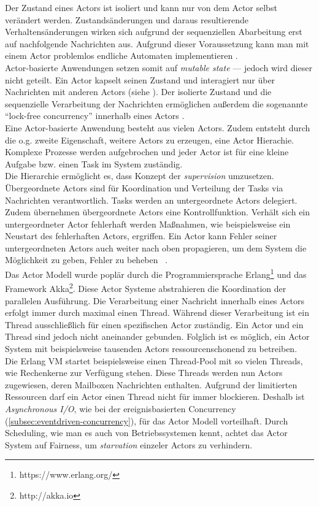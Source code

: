 Der Zustand eines Actors ist isoliert und kann nur von dem Actor selbst verändert werden. Zustandsänderungen und daraus resultierende Verhaltensänderungen wirken sich aufgrund der sequenziellen Abarbeitung erst auf nachfolgende Nachrichten aus. Aufgrund dieser Voraussetzung kann man mit einem Actor problemlos endliche Automaten implementieren \cite[S.~14]{vernon_reactive_2016} \cite[S.~84]{kuhn_reactive_2015}.\\
Actor-basierte Anwendungen setzen somit auf \textit{mutable state} --- jedoch wird dieser nicht geteilt. Ein Actor kapselt seinen Zustand und interagiert nur über Nachrichten mit anderen Actors (siehe ). Der isolierte Zustand und die sequenzielle Verarbeitung der Nachrichten ermöglichen außerdem die sogenannte \enquote{lock-free concurrency} innerhalb eines Actors \cite[S.~85]{kuhn_reactive_2015}.\\
Eine Actor-basierte Anwendung besteht aus vielen Actors. Zudem entsteht durch die o.g. zweite Eigenschaft, weitere Actors zu erzeugen, eine Actor Hierachie. Komplexe Prozesse werden aufgebrochen und jeder Actor ist für eine kleine Aufgabe bzw. einen Task im System zuständig.\\
Die Hierarchie ermöglicht es, dass Konzept der \textit{supervision} umzusetzen. Übergeordnete Actors sind für Koordination und Verteilung der Tasks via Nachrichten verantwortlich. Tasks werden an untergeordnete Actors delegiert. Zudem übernehmen übergeordnete Actors eine Kontrollfunktion. Verhält sich ein untergeordneter Actor fehlerhaft werden Maßnahmen, wie beispielsweise ein Neustart des fehlerhaften Actors, ergriffen. Ein Actor kann Fehler seiner untergeordneten Actors auch weiter nach oben propagieren, um dem System die Möglichkeit zu geben, Fehler zu beheben~\cite[S.~15]{vernon_reactive_2016} \cite[S.~83]{kuhn_reactive_2015} \cite[S.~86]{erb_concurrent_2012}.\\

Das Actor Modell wurde poplär durch die Programmiersprache Erlang\footnote{https://www.erlang.org/} und das Framework Akka\footnote{http://akka.io}. Diese Actor Systeme abstrahieren die Koordination der parallelen Ausführung. Die Verarbeitung einer Nachricht innerhalb eines Actors erfolgt immer durch maximal einen Thread. Während dieser Verarbeitung ist ein Thread ausschließlich für einen spezifischen Actor zuständig. Ein Actor und ein Thread sind jedoch nicht aneinander gebunden. Folglich ist es möglich, ein Actor System mit beispielsweise tausenden Actors ressourcenschonend zu betreiben.\\
Die Erlang VM startet beispielsweise einen Thread-Pool mit so vielen Threads, wie Rechenkerne zur Verfügung stehen. Diese Threads werden nun Actors zugewiesen, deren Mailboxen Nachrichten enthalten. Aufgrund der limitierten Ressourcen darf ein Actor einen Thread nicht für immer blockieren. Deshalb ist \textit{Asynchronous I/O}, wie bei der ereignisbasierten Concurrency (\ref{subsec:eventdriven-concurrency}), für das Actor Modell vorteilhaft. Durch Scheduling, wie man es auch von Betriebssystemen kennt, achtet das Actor System auf Fairness, um \textit{starvation} einzeler Actors zu verhindern.\\

